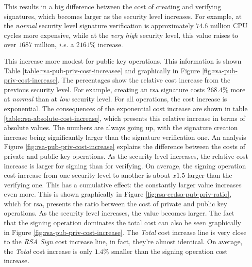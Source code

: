 \documentclass{llncs}
\begin{document}
This results in a big difference between the cost of creating and verifying signatures, which becomes larger as the security level increases.
For example, at the \textit{normal} security level signature verification is approximately $74.6$ million CPU cycles more expensive,
while at the \textit{very high} security level, this value raises to over $1687$ million, \textit{i.e.} a $2161\%$ increase.

This increase more modest for public key operations. This information is shown Table \ref{table:rsa-pub-priv-cost-increasee} and graphically
in Figure \ref{fig:rsa-pub-priv-cost-increase}.
The percentages show the relative cost increase from the previous security level. For example, creating an \gls{rsa} signature costs
$268.4\%$ more at \textit{normal} than at \textit{low} security level. For all operations, the cost increase is exponential.
The consequences of the exponential cost increase are shown in table \ref{table:rsa-absolute-cost-increase}, which presents this relative increase
in terms of absolute values. The numbers are always going up, with the signature creation increase being significantly larger
than the signature verification one. An analysis Figure \ref{fig:rsa-pub-priv-cost-increase}
explains the difference between the costs of private and public key operations. As the security level increases, the relative cost
increase is larger for signing than for verifying. On average, the signing operation cost increase from one security level to another
is about $x1.5$ larger than the verifying one. This has a cumulative effect: the constantly larger value increases even more.
This is shown graphically in Figure \ref{fig:rsa-ecdsa-pub-priv-ratio}, which for \gls{rsa}, presents the ratio between the cost of private and
public key operations. As the security level increases, the value becomes larger. The fact that the signing operation dominates the total cost
can also be seen graphically in Figure \ref{fig:rsa-pub-priv-cost-increase}. The \textit{Total} cost increase line is very close to the
\textit{RSA Sign} cost increase line, in fact, they're almost identical. On average, the \textit{Total} cost increase is only $1.4\%$ smaller
than the signing operation cost increase.
\end{document}
